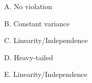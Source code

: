 \documentclass[10pt,draft]{article}
\newcommand{\correct}[1]{{\color{red} #1}}
\newcommand{\correct}[1]{}
\begin{document}
\begin{minipage}{0.4\linewidth}
{\Huge

\vspace{-0.2in}

A.\correct{No violation}

\vspace{1.2in}

B.\correct{Constant variance}

\vspace{1.2in}

C.\correct{Linearity/Independence}

\vspace{1.2in}

D.\correct{Heavy-tailed}

\vspace{1.2in}

E.\correct{Linearity/Independence}
}
\end{minipage}
\end{document}
